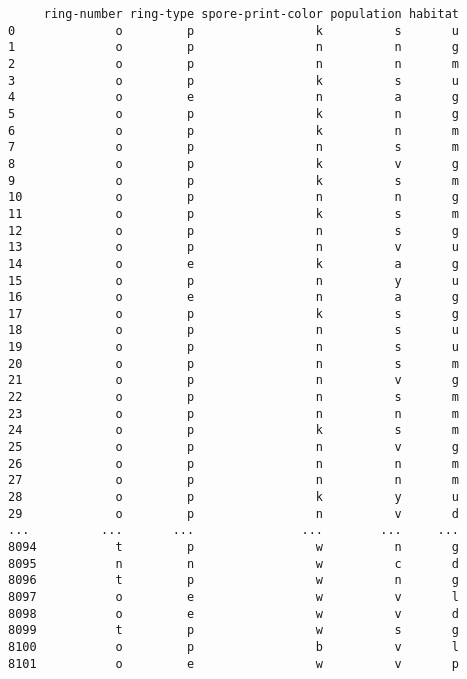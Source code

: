 \documentclass[11pt]{article}
\begin{document}
\begin{verbatim}
     ring-number ring-type spore-print-color population habitat  
0              o         p                 k          s       u  
1              o         p                 n          n       g  
2              o         p                 n          n       m  
3              o         p                 k          s       u  
4              o         e                 n          a       g  
5              o         p                 k          n       g  
6              o         p                 k          n       m  
7              o         p                 n          s       m  
8              o         p                 k          v       g  
9              o         p                 k          s       m  
10             o         p                 n          n       g  
11             o         p                 k          s       m  
12             o         p                 n          s       g  
13             o         p                 n          v       u  
14             o         e                 k          a       g  
15             o         p                 n          y       u  
16             o         e                 n          a       g  
17             o         p                 k          s       g  
18             o         p                 n          s       u  
19             o         p                 n          s       u  
20             o         p                 n          s       m  
21             o         p                 n          v       g  
22             o         p                 n          s       m  
23             o         p                 n          n       m  
24             o         p                 k          s       m  
25             o         p                 n          v       g  
26             o         p                 n          n       m  
27             o         p                 n          n       m  
28             o         p                 k          y       u  
29             o         p                 n          v       d  
...          ...       ...               ...        ...     ...  
8094           t         p                 w          n       g  
8095           n         n                 w          c       d  
8096           t         p                 w          n       g  
8097           o         e                 w          v       l  
8098           o         e                 w          v       d  
8099           t         p                 w          s       g  
8100           o         p                 b          v       l  
8101           o         e                 w          v       p  

\end{verbatim}
\end{document}
